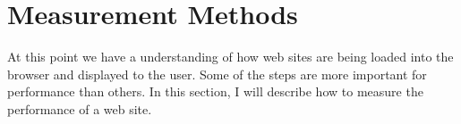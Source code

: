 	
























\section{Measurement Methods}



At this point we have a understanding of how web sites are being loaded into the browser and displayed to the user.
Some of the steps are more important for performance than others.
In this section, I will describe how to measure the performance of a web site.

